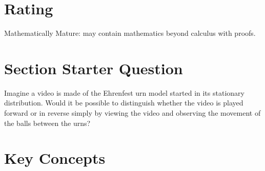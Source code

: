 \documentclass[12pt]{article}
\begin{document}
\myheader \mytitle

\hr


\hr

\usefirefox



\hr

\section*{Rating} %
Mathematically Mature:  may contain mathematics beyond calculus with
proofs.  %

\hr

\section*{Section Starter Question}

Imagine a video is made of the Ehrenfest urn model started in its
stationary distribution.  Would it be possible to distinguish whether
the video is played forward or in reverse simply by viewing the video
and observing the movement of the balls between the urns?

\hr

\section*{Key Concepts}
\end{document}
